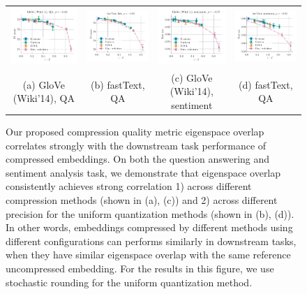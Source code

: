 \begin{figure}
	\footnotesize
	\begin{tabular}{@{\hskip -0.0in}c@{\hskip -0.0in}c@{\hskip -0.0in}c@{\hskip -0.0in}c@{\hskip -0.0in}}
		\includegraphics[width=.245\linewidth]{figures/glove400k_qa_best-f1_vs_subspace-dist-normalized_linx_stoc.pdf} &
		\includegraphics[width=.245\linewidth]{figures/fasttext1m_qa_best-f1_vs_subspace-dist-normalized_linx_stoc.pdf} &
		\includegraphics[width=.245\linewidth]{figures/glove400k_sentiment_sst_test-acc_vs_subspace-dist-normalized_linx_stoc.pdf} &
		\includegraphics[width=.245\linewidth]{figures/fasttext1m_sentiment_sst_test-acc_vs_subspace-dist-normalized_linx_stoc.pdf}	\\
		(a) GloVe (Wiki'14), QA & \;\;\;\;(b) fastText, QA  & \;\;\;\;\;\;(c) GloVe (Wiki'14), sentiment & \;\;\;\;\;(d) fastText, QA
	\end{tabular}
	\caption{Our proposed compression quality metric eigenspace overlap correlates strongly with the downstream task performance of compressed embeddings.  On both the question answering and sentiment analysis task, we demonstrate that eigenspace overlap consistently achieves strong correlation 1) across different compression methods (shown in (a), (c)) and 2) across different precision for the uniform quantization methods (shown in (b), (d)). In other words, embeddings compressed by different methods using different configurations can performs similarly in downstream tasks, when they have similar eigenspace overlap with the same reference uncompressed embedding. For the results in this figure, we use stochastic rounding for the uniform quantization method.}
	\label{fig:good_correlation_det}
\end{figure}

